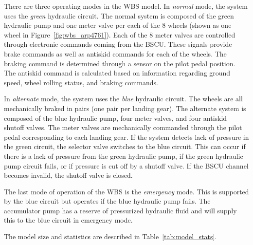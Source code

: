 There are three operating modes in the WBS model. In \textit{normal} mode, the system uses the \textit{green} hydraulic circuit. The normal system is composed of the green hydraulic pump and one meter valve per each of the 8 wheels (shown as one wheel in Figure~\ref{fig:wbs_arp4761}). Each of the 8 meter valves are controlled through electronic commands coming from the BSCU. These signals provide brake commands as well as antiskid commands for each of the wheels. The braking command is determined through a sensor on the pilot pedal position. The antiskid command is calculated based on information regarding ground speed, wheel rolling status, and braking commands.

In \textit{alternate} mode, the system uses the \textit{blue} hydraulic circuit.  The wheels are all mechanically braked in pairs (one pair per landing gear). The alternate system is composed of the blue hydraulic pump, four meter valves, and four antiskid shutoff valves. The meter valves are mechanically commanded through the pilot pedal corresponding to each landing gear. If the system detects lack of pressure in the green circuit, the selector valve switches to the blue circuit. This can occur if there is a lack of pressure from the green hydraulic pump, if the green hydraulic pump circuit fails, or if pressure is cut off by a shutoff valve. If the BSCU channel becomes invalid, the shutoff valve is closed.

The last mode of operation of the WBS is the \textit{emergency} mode. This is supported by the blue circuit but operates if the blue hydraulic pump fails. The accumulator pump has a reserve of pressurized hydraulic fluid and will supply this to the blue circuit in emergency mode.

The model size and statistics are described in Table~\ref{tab:model_stats}. 


